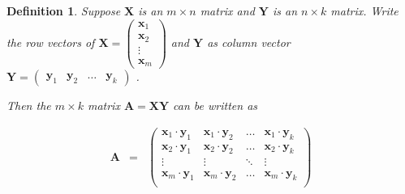 \documentclass{beamer}
\newtheorem{defn}{Definition}
\numberwithin{equation}{section}
\begin{document}
\begin{frame}
\begin{defn} 
 Suppose $\boldsymbol{X}$ is an $m \times n$ matrix and $\boldsymbol{Y}$ is an $n \times k$ matrix. Write the row vectors of $\boldsymbol{X} = \begin{pmatrix} \boldsymbol{x}_{1} \\ \boldsymbol{x}_{2} \\ \vdots\\ \boldsymbol{x}_{m} \end{pmatrix} $ and $\boldsymbol{Y}$ as column vector $\boldsymbol{Y} = \begin{pmatrix} \boldsymbol{y}_{1} & \boldsymbol{y}_{2} & \hdots & \boldsymbol{y}_{k} \end{pmatrix}$ .  
 
Then the $m \times k$ matrix $\boldsymbol{A} = \boldsymbol{X} \boldsymbol{Y}$ can be written as 

\begin{eqnarray}
\boldsymbol{A} & = & \begin{pmatrix} \boldsymbol{x}_{1} \cdot \boldsymbol{y}_{1} & \boldsymbol{x}_{1} \cdot  \boldsymbol{y}_{2} & \hdots & \boldsymbol{x}_{1} \cdot  \boldsymbol{y}_{k}\\
\boldsymbol{x}_{2} \cdot  \boldsymbol{y}_{1} & \boldsymbol{x}_{2} \cdot  \boldsymbol{y}_{2} & \hdots & \boldsymbol{x}_{2}\cdot  \boldsymbol{y}_{k}\\
							\vdots & \vdots & \ddots & \vdots \\
				\boldsymbol{x}_{m} \cdot  \boldsymbol{y}_{1} & \boldsymbol{x}_{m} \cdot \boldsymbol{y}_{2} & \hdots & \boldsymbol{x}_{m} \cdot  \boldsymbol{y}_{k}\\
								\end{pmatrix}  \nonumber 			
\end{eqnarray}

\end{defn}

\end{frame}
\end{document}
